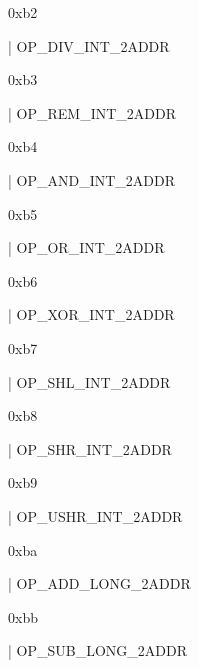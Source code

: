\documentclass[11pt]{article}
\begin{document}
\begin{ocamldoccomment}
0xb2
\end{ocamldoccomment}
\begin{ocamldoccode}
  | OP_DIV_INT_2ADDR
\end{ocamldoccode}
\begin{ocamldoccomment}
0xb3
\end{ocamldoccomment}
\begin{ocamldoccode}
  | OP_REM_INT_2ADDR
\end{ocamldoccode}
\begin{ocamldoccomment}
0xb4
\end{ocamldoccomment}
\begin{ocamldoccode}
  | OP_AND_INT_2ADDR
\end{ocamldoccode}
\begin{ocamldoccomment}
0xb5
\end{ocamldoccomment}
\begin{ocamldoccode}
  | OP_OR_INT_2ADDR
\end{ocamldoccode}
\begin{ocamldoccomment}
0xb6
\end{ocamldoccomment}
\begin{ocamldoccode}
  | OP_XOR_INT_2ADDR
\end{ocamldoccode}
\begin{ocamldoccomment}
0xb7
\end{ocamldoccomment}
\begin{ocamldoccode}
  | OP_SHL_INT_2ADDR
\end{ocamldoccode}
\begin{ocamldoccomment}
0xb8
\end{ocamldoccomment}
\begin{ocamldoccode}
  | OP_SHR_INT_2ADDR
\end{ocamldoccode}
\begin{ocamldoccomment}
0xb9
\end{ocamldoccomment}
\begin{ocamldoccode}
  | OP_USHR_INT_2ADDR
\end{ocamldoccode}
\begin{ocamldoccomment}
0xba
\end{ocamldoccomment}
\begin{ocamldoccode}
  | OP_ADD_LONG_2ADDR
\end{ocamldoccode}
\begin{ocamldoccomment}
0xbb
\end{ocamldoccomment}
\begin{ocamldoccode}
  | OP_SUB_LONG_2ADDR
\end{ocamldoccode}
\end{document}
